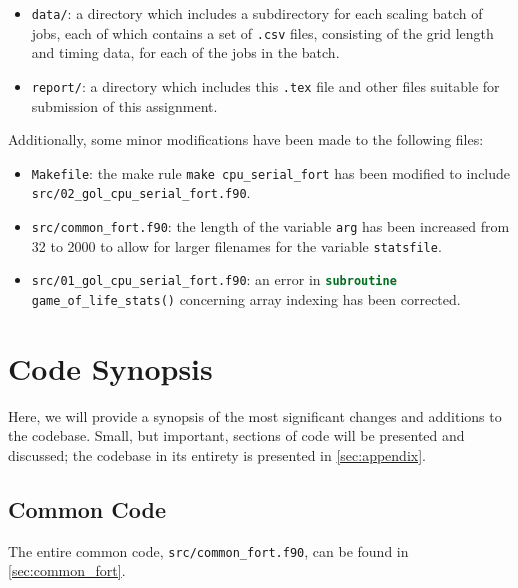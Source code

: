 \documentclass[]{article}
\begin{document}
\begin{itemize}
\item \lstinline[style=ff]{data/}: a directory which includes a subdirectory for
  each scaling batch of jobs, each of which contains a set of
  \lstinline[style=ff]{.csv} files, consisting of the grid length and timing
  data, for each of the jobs in the batch.

\item \lstinline[style=ff]{report/}: a directory which includes this
  \lstinline[style=ff]{.tex} file and other files suitable for submission of
  this assignment.
\end{itemize}

Additionally, some minor modifications have been made to the following files:

\begin{itemize}
\item \lstinline[style=ff]{Makefile}: the make rule
  \lstinline[style=ff]{make cpu_serial_fort} has been modified to include \\
  \lstinline[style=ff]{src/02_gol_cpu_serial_fort.f90}.

\item \lstinline[style=ff]{src/common_fort.f90}: the length of the variable
  \lstinline{arg} has been increased from 32 to 2000 to allow for larger
  filenames for the variable \lstinline{statsfile}.

\item \lstinline[style=ff]{src/01_gol_cpu_serial_fort.f90}: an error in
  \lstinline[language=Fortran]{subroutine game_of_life_stats()} concerning
  array indexing has been corrected.
\end{itemize}

\newpage
\section{Code Synopsis}
\label{sec:code-synopsis}

Here, we will provide a synopsis of the most significant changes and additions
to the codebase.
Small, but important, sections of code will be presented and discussed; the
codebase in its entirety is presented in \autoref{sec:appendix}.

\subsection{Common Code}
\label{sec:common-code}

The entire common code, \lstinline[style=ff]{src/common_fort.f90}, can be found
in \autoref{sec:common_fort}.
\end{document}
